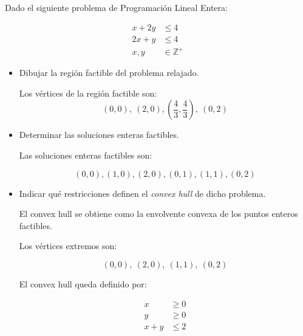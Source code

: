 Dado el siguiente problema de Programación Lineal Entera:

\[
\begin{aligned}
x + 2y &\le 4 \\
2x + y &\le 4 \\
x, y &\in \mathbb{Z^+}
\end{aligned}
\]

\begin{itemize}

\item[a)] Dibujar la región factible del problema relajado.

Los vértices de la región factible son: \[
(0,0), \ (2,0), \left(\frac{4}{3}, \frac{4}{3}\right), \ (0,2)
\]

\item[b)] Determinar las soluciones enteras factibles.

Las soluciones enteras factibles son:

\[
(0,0), (1,0), (2,0), (0,1), (1,1), (0,2)
\]

\item[c)] Indicar qué restricciones definen el \textit{convex hull} de dicho problema.

El convex hull se obtiene como la envolvente convexa de los puntos enteros factibles.

Los vértices extremos son:

\[
(0,0), \ (2,0), \ (1,1), \ (0,2)
\]

El convex hull queda definido por:

\[
\begin{aligned}
x &\ge 0 \\
y &\ge 0 \\
x + y &\le 2
\end{aligned}
\]
\end{itemize}

